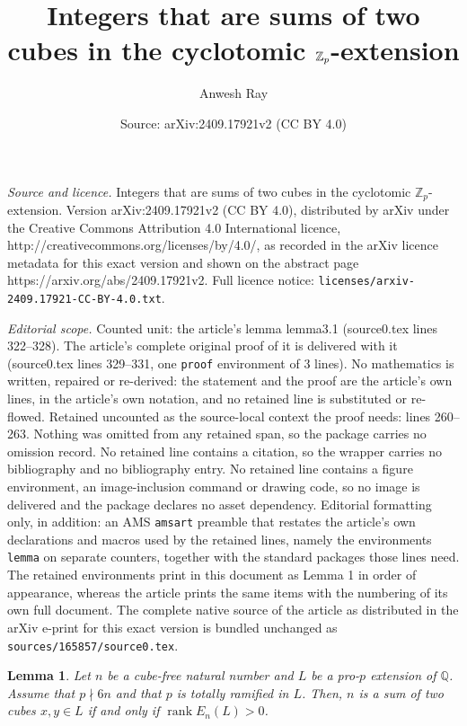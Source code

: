 \documentclass[10pt,a4paper]{amsart}
\title{Integers that are sums of two cubes in the cyclotomic $\Z_p$-extension}
\author{Anwesh Ray}
\date{Source: arXiv:2409.17921v2 (CC BY 4.0)}
\newtheorem{lemma}{Lemma}
\newcommand{\Q}{\mathbb{Q}}
\newcommand{\Z}{\mathbb{Z}}
\newcommand{\op}[1]{\operatorname{#1}}
\begin{document}
\maketitle

\noindent\emph{Source and licence.} Integers that are sums of two cubes in the cyclotomic $\Z_p$-extension. Version arXiv:2409.17921v2 (CC BY 4.0), distributed by arXiv under the Creative Commons Attribution 4.0 International licence, http://creativecommons.org/licenses/by/4.0/, as recorded in the arXiv licence metadata for this exact version and shown on the abstract page https://arxiv.org/abs/2409.17921v2. Full licence notice: \texttt{licenses/arxiv-2409.17921-CC-BY-4.0.txt}.\par\smallskip

\noindent\textit{Editorial scope.} Counted unit: the article's lemma lemma3.1 (source0.tex lines 322--328). The article's complete original proof of it is delivered with it (source0.tex lines 329--331, one \texttt{proof} environment of 3 lines). No mathematics is written, repaired or re-derived: the statement and the proof are the article's own lines, in the article's own notation, and no retained line is substituted or re-flowed.  Retained uncounted as the source-local context the proof needs: lines 260--263.  Nothing was omitted from any retained span, so the package carries no omission record.  No retained line contains a citation, so the wrapper carries no bibliography and no bibliography entry.  No retained line contains a figure environment, an image-inclusion command or drawing code, so no image is delivered and the package declares no asset dependency.  Editorial formatting only, in addition: an AMS \texttt{amsart} preamble that restates the article's own declarations and macros used by the retained lines, namely the environments \texttt{lemma} on separate counters, together with the standard packages those lines need.  The retained environments print in this document as Lemma 1 in order of appearance, whereas the article prints the same items with the numbering of its own full document.  The complete native source of the article as distributed in the arXiv e-print for this exact version is bundled unchanged as \texttt{sources/165857/source0.tex}.
\begin{lemma}\label{lemma 2.1}
    Let $n$ be a cube-free natural number and $L$ be a pro-$p$ extension of $\Q$. 
    Assume that $p\nmid 6n$ and that $p$ is totally ramified in $L$. Then, $n$ is a sum of two cubes $x, y\in L$ if and only if $\op{rank} E_n(L)>0$.
\end{lemma}
\end{document}
